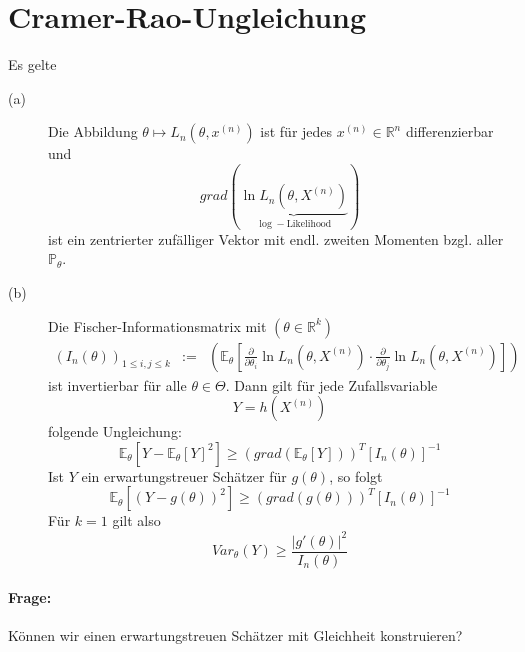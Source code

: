 \documentclass[10pt,a4paper]{report}
\numberwithin{equation}{section}
\numberwithin{figure}{section}
\theoremstyle{plain}
\theoremstyle{definition}
\theoremstyle{remark}
\theoremstyle{plain}
\newcommand{\1}{ \mathbb{1} } %
\begin{document}
\section{Cramer-Rao-Ungleichung}

Es gelte 
\begin{description}
\item [{(a)}] Die Abbildung $\theta\mapsto L_{n}\left(\theta,x^{\left(n\right)}\right)$
ist für jedes $x^{(n)}\in\mathbb{R}^{n}$ differenzierbar und 
\[
grad(\underset{\log-\mbox{Likelihood}}{\underbrace{\ln L_{n}\left(\theta,X^{\left(n\right)}\right)}})
\]
ist ein zentrierter zufälliger Vektor mit endl. zweiten Momenten bzgl.
aller $\mathbb{P}_{\theta}$. 
\item [{(b)}] Die Fischer-Informationsmatrix mit $\left(\theta\in\mathbb{R}^{k}\right)$
\begin{eqnarray*}
\left(I_{n}\left(\theta\right)\right)_{1\leq i,j\leq k} & := & \left(\mathbb{E}_{\theta}\left[\frac{\partial}{\partial\theta_{i}}\ln L_{n}\left(\theta,X^{\left(n\right)}\right)\cdot\frac{\partial}{\partial\theta_{j}}\ln L_{n}\left(\theta,X^{\left(n\right)}\right)\right]\right)
\end{eqnarray*}
ist invertierbar für alle $\theta\in\Theta$. Dann gilt für jede Zufallsvariable
\[
Y=h\left(X^{\left(n\right)}\right)
\]
folgende Ungleichung:
\[
\mathbb{E}_{\theta}\left[Y-\mathbb{E}_{\theta}\left[Y\right]^{2}\right]\geq\left(grad\left(\mathbb{E}_{\theta}\left[Y\right]\right)\right)^{T}\left[I_{n}\left(\theta\right)\right]^{-1}
\]
Ist $Y$ ein erwartungstreuer Schätzer für $g\left(\theta\right)$,
so folgt 
\[
\mathbb{E}_{\theta}\left[\left(Y-g\left(\theta\right)\right)^{2}\right]\geq\left(grad\left(g\left(\theta\right)\right)\right)^{T}\left[I_{n}\left(\theta\right)\right]^{-1}
\]
Für $k=1$ gilt also 
\[
Var_{\theta}\left(Y\right)\geq\frac{\left|g'\left(\theta\right)\right|^{2}}{I_{n}\left(\theta\right)}
\]

\end{description}

\paragraph*{Frage:}

Können wir einen erwartungstreuen Schätzer mit Gleichheit konstruieren?

\printindex
\end{document}
